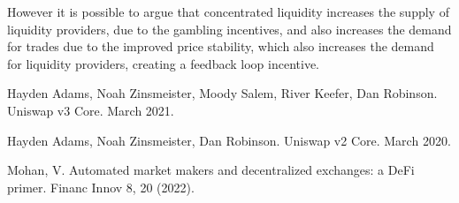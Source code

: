 \documentclass{article}
\begin{document}
However it is possible to argue that concentrated liquidity increases the supply of liquidity providers, due to the gambling incentives, and also increases the demand for trades due to the improved price stability, which also increases the demand for liquidity providers, creating a feedback loop incentive.

\begin{thebibliography}{9}
Hayden Adams, Noah Zinsmeister, Moody Salem, River Keefer, Dan Robinson. Uniswap v3 Core. March 2021.

Hayden Adams, Noah Zinsmeister, Dan Robinson. Uniswap v2 Core. March 2020.

Mohan, V. Automated market makers and decentralized exchanges: a DeFi primer. Financ Innov 8, 20 (2022).

\end{thebibliography}
\end{document}
